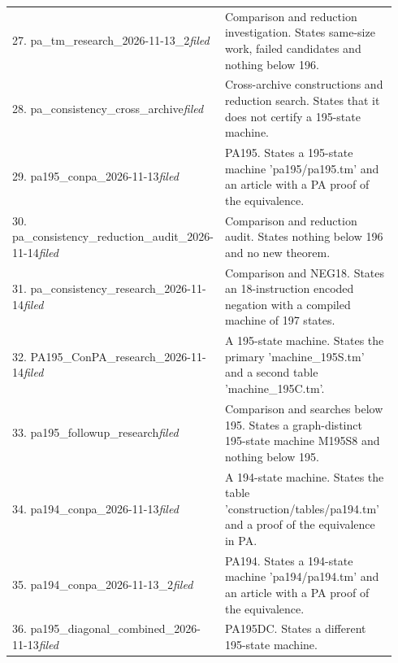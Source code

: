 \begin{longtable}{@{}p{0.43\linewidth}p{0.51\linewidth}@{}}
27. pa\_\allowbreak{}tm\_\allowbreak{}research\_\allowbreak{}2026-11-13\_\allowbreak{}2\newline\emph{filed} & Comparison and reduction investigation. States same-size work, failed candidates and nothing below 196.\\[5pt]
28. pa\_\allowbreak{}consistency\_\allowbreak{}cross\_\allowbreak{}archive\newline\emph{filed} & Cross-archive constructions and reduction search. States that it does not certify a 195-state machine.\\[5pt]
29. pa195\_\allowbreak{}conpa\_\allowbreak{}2026-11-13\newline\emph{filed} & PA195. States a 195-state machine 'pa195/pa195.tm' and an article with a PA proof of the equivalence.\\[5pt]
30. pa\_\allowbreak{}consistency\_\allowbreak{}reduction\_\allowbreak{}audit\_\allowbreak{}2026-11-14\newline\emph{filed} & Comparison and reduction audit. States nothing below 196 and no new theorem.\\[5pt]
31. pa\_\allowbreak{}consistency\_\allowbreak{}research\_\allowbreak{}2026-11-14\newline\emph{filed} & Comparison and NEG18. States an 18-instruction encoded negation with a compiled machine of 197 states.\\[5pt]
32. PA195\_\allowbreak{}ConPA\_\allowbreak{}research\_\allowbreak{}2026-11-14\newline\emph{filed} & A 195-state machine. States the primary 'machine\_\allowbreak{}195S.tm' and a second table 'machine\_\allowbreak{}195C.tm'.\\[5pt]
33. pa195\_\allowbreak{}followup\_\allowbreak{}research\newline\emph{filed} & Comparison and searches below 195. States a graph-distinct 195-state machine M195S8 and nothing below 195.\\[5pt]
34. pa194\_\allowbreak{}conpa\_\allowbreak{}2026-11-13\newline\emph{filed} & A 194-state machine. States the table 'construction/tables/pa194.tm' and a proof of the equivalence in PA.\\[5pt]
35. pa194\_\allowbreak{}conpa\_\allowbreak{}2026-11-13\_\allowbreak{}2\newline\emph{filed} & PA194. States a 194-state machine 'pa194/pa194.tm' and an article with a PA proof of the equivalence.\\[5pt]
36. pa195\_\allowbreak{}diagonal\_\allowbreak{}combined\_\allowbreak{}2026-11-13\newline\emph{filed} & PA195DC. States a different 195-state machine.\\[5pt]

\end{longtable}
